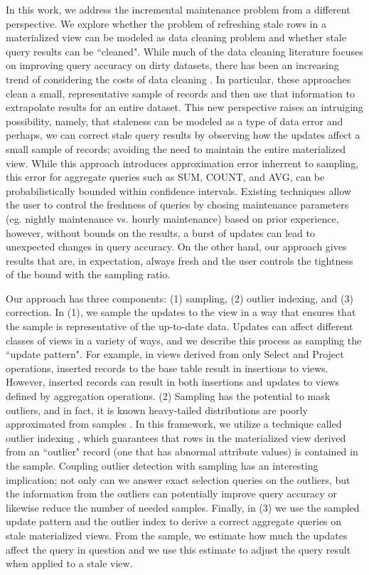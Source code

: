 In this work, we address the incremental maintenance problem from a different perspective.
We explore whether the problem of refreshing stale rows in a materialized view can be modeled as data cleaning problem and whether stale query results can be ``cleaned".
While much of the data cleaning literature focuses on improving query accuracy on dirty datasets,
there has been an increasing trend of considering the costs of data cleaning \cite{wang1999sample}.
In particular, these approaches clean a small, representative sample of records and then use that information to extrapolate results for an entire dataset.
This new perspective raises an intruiging possibility, namely, that staleness can be modeled as a type of data error 
and perhaps, we can correct stale query results by observing how the updates affect a small sample of records; 
avoiding the need to maintain the entire materialized view.
While this approach introduces approximation error inherrent to sampling, this error for aggregate queries such as SUM, COUNT, and AVG, 
can be probabilistically bounded within confidence intervals.
Existing techniques allow the user to control the freshness of queries by chosing maintenance parameters (eg. nightly maintenance vs. hourly maintenance) based on prior experience, however, without bounds on the results, a burst of updates can lead to unexpected changes in query accuracy.
On the other hand, our approach gives results that are, in expectation, always fresh and the user controls the tightness of the bound with the sampling ratio.

Our approach has three components: (1) sampling, (2) outlier indexing, and (3) correction. In (1), we sample the updates to the view in a way that ensures that the sample is representative of the up-to-date data. Updates can affect different classes of views in a variety of ways, and we describe this process as sampling the ``update pattern". For example, in views derived from only Select and Project operations, inserted records to the base table result in insertions to views. However, inserted records can result in both insertions and updates to views defined by aggregation operations. (2) Sampling has the potential to mask outliers, and in fact, it is known
heavy-tailed distributions are poorly approximated from samples \cite{chaudhuri2001overcoming}.
In this framework, we utilize a technique called outlier indexing \cite{chaudhuri2001overcoming}, which guarantees that rows in the materialized view derived from an ``outlier" record (one that has abnormal attribute values) is contained in the sample.
Coupling outlier detection with sampling has an interesting implication; not only can we answer exact selection queries on the outliers, but
the information from the outliers can potentially improve query accuracy or likewise reduce the number of needed samples.
Finally, in (3) we use the sampled update pattern and the outlier index to derive a correct aggregate queries on stale materialized views.
From the sample, we estimate how much the updates affect the query in question and we use this estimate to adjust the query result when applied to a stale view.

